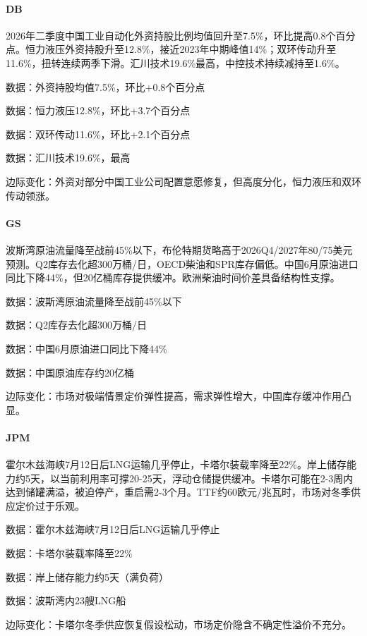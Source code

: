 \documentclass[11pt]{ctexart}
\begin{document}
\paragraph{DB} 2026年二季度中国工业自动化外资持股比例均值回升至7.5\%，环比提高0.8个百分点。恒力液压外资持股升至12.8\%，接近2023年中期峰值14\%；双环传动升至11.6\%，扭转连续两季下滑。汇川技术19.6\%最高，中控技术持续减持至1.6\%。
{\small\color{refgray}数据：外资持股均值7.5\%，环比+0.8个百分点\par}
{\small\color{refgray}数据：恒力液压12.8\%，环比+3.7个百分点\par}
{\small\color{refgray}数据：双环传动11.6\%，环比+2.1个百分点\par}
{\small\color{refgray}数据：汇川技术19.6\%，最高\par}
{\small\color{refgray}边际变化：外资对部分中国工业公司配置意愿修复，但高度分化，恒力液压和双环传动领涨。\par}
\paragraph{GS} 波斯湾原油流量降至战前45\%以下，布伦特期货略高于2026Q4/2027年80/75美元预测。Q2库存去化超300万桶/日，OECD柴油和SPR库存偏低。中国6月原油进口同比下降44\%，但20亿桶库存提供缓冲。欧洲柴油时间价差具备结构性支撑。
{\small\color{refgray}数据：波斯湾原油流量降至战前45\%以下\par}
{\small\color{refgray}数据：Q2库存去化超300万桶/日\par}
{\small\color{refgray}数据：中国6月原油进口同比下降44\%\par}
{\small\color{refgray}数据：中国原油库存约20亿桶\par}
{\small\color{refgray}边际变化：市场对极端情景定价弹性提高，需求弹性增大，中国库存缓冲作用凸显。\par}
\paragraph{JPM} 霍尔木兹海峡7月12日后LNG运输几乎停止，卡塔尔装载率降至22\%。岸上储存能力约5天，以当前利用率可撑20-25天，浮动仓储提供缓冲。卡塔尔可能在2-3周内达到储罐满溢，被迫停产，重启需2-3个月。TTF约60欧元/兆瓦时，市场对冬季供应定价过于乐观。
{\small\color{refgray}数据：霍尔木兹海峡7月12日后LNG运输几乎停止\par}
{\small\color{refgray}数据：卡塔尔装载率降至22\%\par}
{\small\color{refgray}数据：岸上储存能力约5天（满负荷）\par}
{\small\color{refgray}数据：波斯湾内23艘LNG船\par}
{\small\color{refgray}边际变化：卡塔尔冬季供应恢复假设松动，市场定价隐含不确定性溢价不充分。\par}
\end{document}
